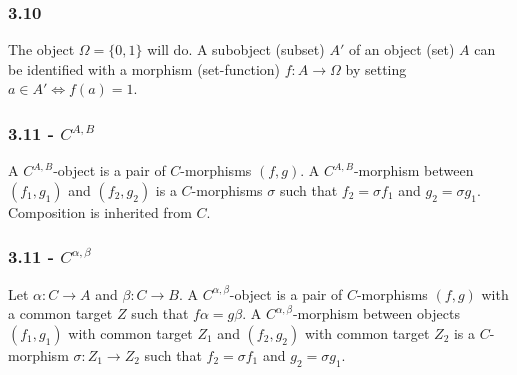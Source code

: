 \documentclass{article}
\begin{document}
\subsubsection*{3.10}

The object $\Omega = \{0, 1\}$ will do. A subobject (subset) $A'$ of an object (set) $A$ can be identified with a morphism (set-function) $f: A \to \Omega$ by setting $a \in A' \iff f(a) = 1$.

\subsubsection*{3.11 - $C^{A,B}$}

A $C^{A,B}$-object is a pair of $C$-morphisms $(f, g)$. A $C^{A,B}$-morphism between $(f_1, g_1)$ and $(f_2, g_2)$ is a $C$-morphisms $\sigma$ such that $f_2 = \sigma f_1$ and $g_2 = \sigma g_1$. Composition is inherited from $C$.


\subsubsection*{3.11 - $C^{\alpha, \beta}$}

Let $\alpha: C \to A$ and $\beta: C \to B$. A $C^{\alpha, \beta}$-object is a pair of $C$-morphisms $(f, g)$ with a common target $Z$ such that $f\alpha = g\beta$. A $C^{\alpha, \beta}$-morphism between objects $(f_1, g_1)$ with common target $Z_1$ and $(f_2, g_2)$ with common target $Z_2$ is a $C$-morphism $\sigma: Z_1 \to Z_2$ such that $f_2 = \sigma f_1$ and $g_2 = \sigma g_1$.

\end{document}
